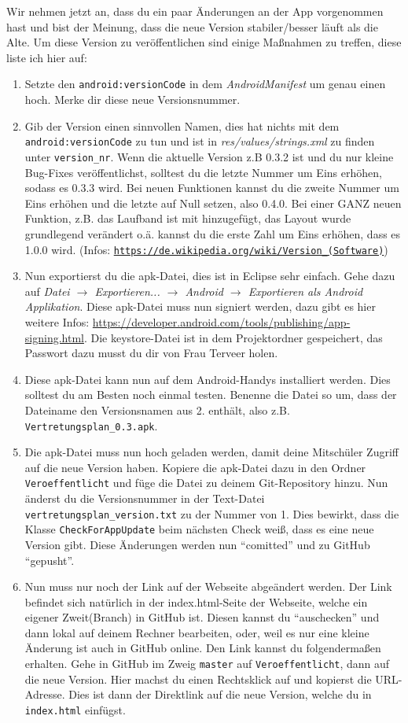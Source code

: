 \documentclass[12pt,headsepline]{scrartcl}
\begin{document}
Wir nehmen jetzt an, dass du ein paar Änderungen an der App vorgenommen hast und bist der Meinung, dass die neue Version stabiler/besser läuft als die Alte.
Um diese Version zu veröffentlichen sind einige Maßnahmen zu treffen, diese liste ich hier auf:
\begin{enumerate}
 \item Setzte den \texttt{android:versionCode} in dem \textit{AndroidManifest} um genau einen hoch. Merke dir diese neue Versionsnummer.
 \item Gib der Version einen sinnvollen Namen, dies hat nichts mit dem \texttt{android:versionCode} zu tun und ist in \textit{res/values/strings.xml} zu finden unter \texttt{version\_nr}. Wenn die aktuelle Version z.B 0.3.2 ist und du nur kleine Bug-Fixes veröffentlichst, solltest du die letzte Nummer um Eins erhöhen, sodass es 0.3.3 wird. Bei neuen Funktionen kannst du die zweite Nummer um Eins erhöhen und die letzte auf Null setzen, also 0.4.0. Bei einer GANZ neuen Funktion, z.B. das Laufband ist mit hinzugefügt, das Layout wurde grundlegend verändert o.ä. kannst du die erste Zahl um Eins erhöhen, dass es 1.0.0 wird. (Infos: \href{https://de.wikipedia.org/wiki/Version_\%28Software\%29}{\texttt{https://de.wikipedia.org/wiki/Version\_(Software)}})
 \item Nun exportierst du die apk-Datei, dies ist in Eclipse sehr einfach. Gehe dazu auf \textit{Datei $\rightarrow$ Exportieren... $\rightarrow$ Android $\rightarrow$ Exportieren als Android Applikation}. Diese apk-Datei muss nun signiert werden, dazu gibt es hier weitere Infos: \url{https://developer.android.com/tools/publishing/app-signing.html}. Die keystore-Datei ist in dem Projektordner gespeichert, das Passwort dazu musst du dir von Frau Terveer holen.
 \item Diese apk-Datei kann nun auf dem Android-Handys installiert werden. Dies solltest du am Besten noch einmal testen. Benenne die Datei so um, dass der Dateiname den Versionsnamen aus 2. enthält, also z.B. \texttt{Vertretungsplan\_0.3.apk}.
 \item Die apk-Datei muss nun hoch geladen werden, damit deine Mitschüler Zugriff auf die neue Version haben. Kopiere die apk-Datei dazu in den Ordner \texttt{Veroeffentlicht} und füge die Datei zu deinem Git-Repository hinzu. Nun änderst du die Versionsnummer in der Text-Datei \texttt{vertretungsplan\_version.txt} zu der Nummer von 1.  Dies bewirkt, dass die Klasse \texttt{CheckForAppUpdate} beim nächsten Check weiß, dass es eine neue Version gibt. Diese Änderungen werden nun ``comitted'' und zu GitHub ``gepusht''.
 \item Nun muss nur noch der Link auf der Webseite abgeändert werden. Der Link befindet sich natürlich in der index.html-Seite der Webseite, welche ein eigener Zweit(Branch) in GitHub ist. Diesen kannst du ``auschecken'' und dann lokal auf deinem Rechner bearbeiten, oder, weil es nur eine kleine Änderung ist auch in GitHub online. Den Link kannst du folgendermaßen erhalten. Gehe in GitHub im Zweig \texttt{master} auf \texttt{Veroeffentlicht}, dann auf die neue Version. Hier machst du einen Rechtsklick auf  und kopierst die URL-Adresse. Dies ist dann der Direktlink auf die neue Version, welche du in \texttt{index.html} einfügst.
 \end{enumerate}
\end{document}
